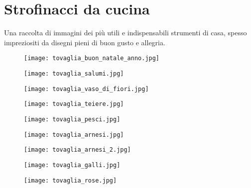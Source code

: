 \chapter[]{Strofinacci da cucina}
\graphicspath{ {./images/chapter7/} }

Una raccolta di immagini dei più utili e indispensabili strumenti di casa, spesso impreziositi da disegni pieni di buon gusto e allegria.

\newpage

\begin{figure}[h]
	\centering
		\texttt{[image: tovaglia\_buon\_natale\_anno.jpg]}
	\caption{}
	\label{fig:tovaglia_buon_natale_anno}
\end{figure}

\newpage

\begin{figure}[h]
	\centering
		\texttt{[image: tovaglia\_salumi.jpg]}
	\caption{}
	\label{fig:tovaglia_salumi}
\end{figure}

\newpage

\begin{figure}[h]
	\centering
		\texttt{[image: tovaglia\_vaso\_di\_fiori.jpg]}
	\caption{}
	\label{fig:tovaglia_vaso_di_fiori}
\end{figure}

\newpage

\begin{figure}[h]
	\centering
		\texttt{[image: tovaglia\_teiere.jpg]}
	\caption{}
	\label{fig:tovaglia_teiere}
\end{figure}

\newpage

\begin{figure}[h]
	\centering
		\texttt{[image: tovaglia\_pesci.jpg]}
	\caption{}
	\label{fig:tovaglia_pesci}
\end{figure}

\newpage

\begin{figure}[h]
	\centering
		\texttt{[image: tovaglia\_arnesi.jpg]}
	\caption{}
	\label{fig:tovaglia_arnesi}
\end{figure}

\newpage

\begin{figure}[h]
	\centering
		\texttt{[image: tovaglia\_arnesi\_2.jpg]}
	\caption{}
	\label{fig:tovaglia_arnesi_2}
\end{figure}

\newpage

\begin{figure}[h]
	\centering
		\texttt{[image: tovaglia\_galli.jpg]}
	\caption{}
	\label{fig:tovaglia_galli}
\end{figure}

\newpage

\begin{figure}[h]
	\centering
		\texttt{[image: tovaglia\_rose.jpg]}
	\caption{}
	\label{fig:tovaglia_rose}
\end{figure}


\clearpage


